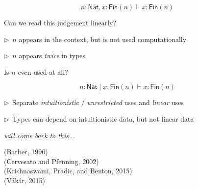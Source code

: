 \documentclass[xetex,serif,mathserif,aspectratio=169]{beamer}
\begin{document}
\newcommand{\point}{\textcolor{titlered}{$\rhd$}~}

\begin{frame}
  \begin{displaymath}
    n : \mathsf{Nat}, x : \mathsf{Fin}(n) \vdash x : \mathsf{Fin}(n)
  \end{displaymath}

  \bigskip

  Can we read this judgement linearly?

  \pause
  \bigskip

  \point $n$ appears in the context, but is not used computationally

  \pause
  \bigskip

  \point $n$ appears \emph{twice} in types

  \pause
  \bigskip

  Is $n$ even used at all?
\end{frame}

\begin{frame}
  \begin{displaymath}
    n : \mathsf{Nat} \mid x : \mathsf{Fin}(n) \vdash x : \mathsf{Fin}(n)
  \end{displaymath}

  \bigskip
  \pause

  \point Separate \emph{intuitionistic} / \emph{unrestricted} uses and \emph{linear} uses

  \pause
  \bigskip

  \point Types can depend on intuitionistic data, but not linear data

  \raggedleft
  \textcolor{black!60}{\it will come back to this...}

  \raggedright

  \pause
  \bigskip

  {\footnotesize
    \textcolor{black!60}{(Barber, 1996)} \\
    \textcolor{black!60}{(Cervesato and Pfenning, 2002)} \\
    \textcolor{black!60}{(Krishnaswami, Pradic, and Benton, 2015)} \\
    \textcolor{black!60}{(V{\'a}k{\'a}r, 2015)}\\
  }
\end{frame}


\end{document}

